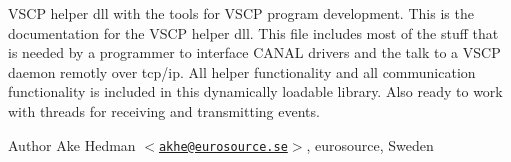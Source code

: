 VSCP helper dll with the tools for VSCP program development. This is the documentation for the VSCP helper dll. This file includes most of the stuff that is needed by a programmer to interface CANAL drivers and the talk to a VSCP daemon remotly over tcp/ip. All helper functionality and all communication functionality is included in this dynamically loadable library. Also ready to work with threads for receiving and transmitting events. \begin{DoxyAuthor}{Author}
Ake Hedman $<$\href{mailto:akhe@eurosource.se}{\tt akhe@eurosource.se}$>$, eurosource, Sweden 
\end{DoxyAuthor}
